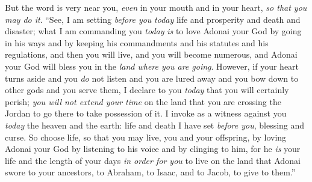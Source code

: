 \begin{biblechapter}
\verse But the word is very near you, \textit{even} in your mouth and in your heart, \textit{so that you may do it}.
\verse “See, I am setting \textit{before you} \textit{today} life and prosperity and death and disaster;
\verse what I am commanding you \textit{today} \textit{is} to love Adonai your God by going in his ways and by keeping his commandments and his statutes and his regulations, and then you will live, and you will become numerous, and Adonai your God will bless you in the \textit{land where you are going}.
\verse However, if your heart turns aside and you \textit{do} not listen and you are lured away and you bow down to other gods and you serve them,
\verse I declare to you \textit{today} that you will certainly perish; \textit{you will not extend your time} on the land that you are crossing the Jordan to go there to take possession of it.
\verse I invoke as a witness against you \textit{today} the heaven and the earth: life and death I have set \textit{before you}, blessing and curse. So choose life, so that you may live, you and your offspring,
\verse by loving Adonai your God by listening to his voice and by clinging to him, for he \textit{is} your life and the length of your days \textit{in order for you} to live on the land that Adonai swore to your ancestors, to Abraham, to Isaac, and to Jacob, to give to them.”
\end{biblechapter}

